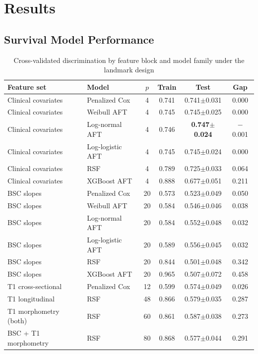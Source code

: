 \documentclass[blue]{ludusofficial}  %
\begin{document}
\section{Results}

\subsection{Survival Model Performance}

\begin{table}[!htbp]
\centering
\caption{Cross-validated discrimination by feature block and model family under the landmark design}
\label{tab:model-performance}
\begin{tabular}{llcccc}
\hline
\textbf{Feature set} & \textbf{Model} & \textbf{$p$} & \textbf{Train} & \textbf{Test} & \textbf{Gap} \\
\hline
Clinical covariates & Penalized Cox & 4 & 0.741 & 0.741$\pm$0.031 & 0.000 \\
Clinical covariates & Weibull AFT & 4 & 0.745 & 0.745$\pm$0.025 & 0.000 \\
Clinical covariates & Log-normal AFT & 4 & 0.746 & \textbf{0.747$\pm$0.024} & $-$0.001 \\
Clinical covariates & Log-logistic AFT & 4 & 0.745 & 0.745$\pm$0.024 & 0.000 \\
Clinical covariates & RSF & 4 & 0.789 & 0.725$\pm$0.033 & 0.064 \\
Clinical covariates & XGBoost AFT & 4 & 0.888 & 0.677$\pm$0.051 & 0.211 \\
\hline
BSC slopes & Penalized Cox & 20 & 0.573 & 0.523$\pm$0.049 & 0.050 \\
BSC slopes & Weibull AFT & 20 & 0.584 & 0.546$\pm$0.046 & 0.038 \\
BSC slopes & Log-normal AFT & 20 & 0.584 & 0.552$\pm$0.048 & 0.032 \\
BSC slopes & Log-logistic AFT & 20 & 0.589 & 0.556$\pm$0.045 & 0.032 \\
BSC slopes & RSF & 20 & 0.844 & 0.501$\pm$0.048 & 0.342 \\
BSC slopes & XGBoost AFT & 20 & 0.965 & 0.507$\pm$0.072 & 0.458 \\
\hline
T1 cross-sectional & Penalized Cox & 12 & 0.599 & 0.574$\pm$0.049 & 0.026 \\
T1 longitudinal & RSF & 48 & 0.866 & 0.579$\pm$0.035 & 0.287 \\
T1 morphometry (both) & RSF & 60 & 0.861 & 0.587$\pm$0.038 & 0.273 \\
BSC + T1 morphometry & RSF & 80 & 0.868 & 0.577$\pm$0.044 & 0.291 \\

\end{tabular}
\end{table}
\end{document}
